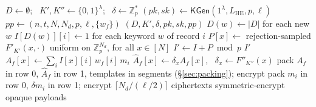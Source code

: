 \documentclass[a4paper,fleqn]{cas-sc}
\begin{document}
\begin{algorithm}[t]
\footnotesize
\caption{Outsourcing at the data owner.}
\label{alg:outsource}
\begin{algorithmic}[1]
  \State $D\gets\emptyset$; \ $K',K''\gets\{0,1\}^\lambda$; \
         $\delta\gets\mathbb{Z}_p^{*}$
  \State $(pk,sk)\gets\mathsf{KGen}(1^\lambda,L_{\mathrm{HE}},p,\ell)$
  \State $pp\gets(n,t,N,N_d,p,\ell,\{w_f\})$
  \State \Return $(D,K',\delta,pk,sk,pp)$
\EndProcedure
\Statex
{}
  \State $D(w)\gets|D|$ for each new $w$
  \State $I[D(w)][i]\gets 1$ for each keyword $w$ of record $i$
  \State $P[x]\gets$ rejection-sampled $F'_{K'}(x,\cdot)$
  \Statex \hfill uniform on $\mathbb{Z}_p^{N_d}$, for all $x\in[N]$
  \State $I'\gets I+P \bmod p$
  \State \Return $I'$ 
\EndProcedure
\Statex
{}
    \State $A_f[x]\gets\sum_i I[x][i]\,w_f[i]\,m_i$
    \State $\widehat{A}_f[x]\gets\delta_x A_f[x]$,
           \ $\delta_x\gets F''_{K''}(x)$
    \State pack $A_f$ in row 0, $\widehat{A}_f$ in row 1,
    \Statex \hfill templates in segments (\S\ref{sec:packing}); encrypt
  \EndFor
\EndProcedure
\Statex
{}
  \State pack $m_i$ in row 0, $\delta m_i$ in row 1; encrypt
  \Statex \hfill $\lceil N_d/(\ell/2)\rceil$ ciphertexts
  \State symmetric-encrypt opaque payloads
\EndProcedure
\end{algorithmic}
\end{algorithm}
\end{document}
